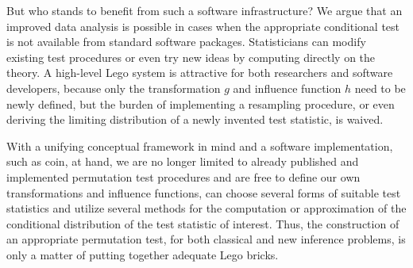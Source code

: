 \documentclass{article}
\newcommand{\Rpackage}[1]{{\normalfont\fontseries{b}\selectfont #1}}
\newcommand{\RR}{\textsf{R}}
\renewcommand{\baselinestretch}{1.65}
\begin{document}
But who stands to benefit from such a software infrastructure? We argue 
that an improved data analysis is possible in cases when the appropriate 
conditional test is not available from standard software packages.
Statisticians can modify existing test procedures or even try new ideas by
computing directly on the theory. A high-level Lego system is attractive for
both researchers and software developers, because only the transformation $g$ and influence
function $h$ need to be newly defined, but the burden of implementing a
resampling procedure, or even deriving the limiting distribution of a newly
invented test statistic, is waived. 


With a unifying conceptual framework in mind and a software implementation, such as
\Rpackage{coin}, at hand, we are no longer limited to already published and 
implemented permutation test procedures and are free to define our own transformations and
influence functions, can choose several forms of suitable test statistics and
utilize several methods for the computation or approximation of 
the conditional distribution of the test statistic of interest. Thus, the
construction of an appropriate permutation test, for both classical and
new inference problems, is only a matter of putting together
adequate Lego bricks.



\renewcommand{\baselinestretch}{1}




\clearpage

\pagestyle{empty}
\end{document}
